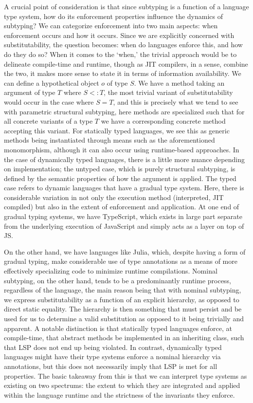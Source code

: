 A crucial point of consideration is that since subtyping is a function of a language type system, how do its enforcement properties influence the dynamics of subtyping? We can categorize enforcement into two main aspects: when enforcement occurs and how it occurs. Since we are explicitly concerned with substitutability, the question becomes: when do languages enforce this, and how do they do so? When it comes to the `when,' the trivial approach would be to delineate compile-time and runtime, though as JIT compilers, in a sense, combine the two, it makes more sense to state it in terms of information availability. We can define a hypothetical object $o$ of type $S$. We have a method taking an argument of type $T$ where $S <: T$, the most trivial variant of substitutability would occur in the case where $S = T$, and this is precisely what we tend to see with parametric structural subtyping, here methods are specialized such that for all concrete variants of a type $T$ we have a corresponding concrete method accepting this variant. For statically typed languages, we see this as generic methods being instantiated through means such as the aforementioned monomorphism, although it can also occur using runtime-based approaches. In the case of dynamically typed languages, there is a little more nuance depending on implementation; the untyped case, which is purely structural subtyping, is defined by the semantic properties of how the argument is applied. The typed case refers to dynamic languages that have a gradual type system. Here, there is considerable variation in not only the execution method (interpreted, JIT compiled) but also in the extent of enforcement and application. At one end of gradual typing systems, we have TypeScript, which exists in large part separate from the underlying execution of JavaScript and simply acts as a layer on top of JS.

On the other hand, we have languages like Julia, which, despite having a form of gradual typing, make considerable use of type annotations as a means of more effectively specializing code to minimize runtime compilations. Nominal subtyping, on the other hand, tends to be a predominantly runtime process, regardless of the language, the main reason being that with nominal subtyping, we express substitutability as a function of an explicit hierarchy, as opposed to direct static equality. The hierarchy is then something that must persist and be used for us to determine a valid substitution as opposed to it being trivially and apparent. A notable distinction is that statically typed languages enforce, at compile-time, that abstract methods be implemented in an inheriting class, such that LSP does not end up being violated. In contrast, dynamically typed languages might have their type systems enforce a nominal hierarchy via annotations, but this does not necessarily imply that LSP is met for all properties. The basic takeaway from this is that we can interpret type systems as existing on two spectrums: the extent to which they are integrated and applied within the language runtime and the strictness of the invariants they enforce. 

